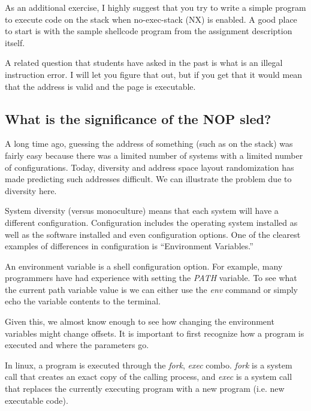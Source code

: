 As an additional exercise, I highly suggest that you try to write a simple program to execute code on the stack when no-exec-stack (NX) is enabled. A good place to start is with the sample shellcode program from the assignment description itself.

A related question that students have asked in the past is what is an illegal instruction error. I will let you figure that out, but if you get that it would mean that the address is valid and the page is executable. 

\subsection{What is the significance of the NOP sled?}

A long time ago, guessing the address of something (such as on the stack) was fairly easy because there was a limited number of systems with a limited number of configurations. Today, diversity and address space layout randomization has made predicting such addresses difficult. We can illustrate the problem due to diversity here. 

System diversity (versus monoculture) means that each system will have a different configuration. Configuration includes the operating system installed as well as the software installed and even configuration options. One of the clearest examples of differences in configuration is ``Environment Variables.''

An environment variable is a shell configuration option. For example, many programmers have had experience with setting the {\em PATH} variable. To see what the current path variable value is we can either use the {\em env} command or simply echo the variable contents to the terminal.


Given this, we almost know enough to see how changing the environment variables might change offsets. It is important to first recognize how a program is executed and where the parameters go. 

In linux, a program is executed through the {\em fork}, {\em exec} combo. {\em fork} is a system call that creates an exact copy of the calling process, and {\em exec} is a system call that replaces the currently executing program with a new program (i.e. new executable code). 

